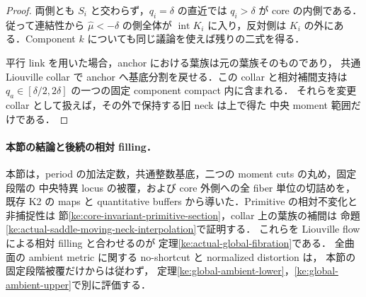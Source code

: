 \begin{proof}
両側とも $S_i$ と交わらず，$q_i=\delta$ の直近では
$q_i>\delta$ が core の内側である．従って連結性から
$\widehat\mu<-\delta$ の側全体が $\operatorname{int}K_i$ に入り，反対側は
$K_i$ の外にある．Component $k$ についても同じ議論を使えば残りの二式を得る．

平行 link を用いた場合，anchor における葉族は元の葉族そのものであり，
共通 Liouville collar で anchor へ基底分割を戻せる．この collar と相対補間支持は
$q_a\in[\delta/2,2\delta]$ の一つの固定 component compact 内に含まれる．
それらを変更 collar として扱えば，その外で保持する旧 neck は上で得た
中央 moment 範囲だけである．
\end{proof}

\paragraph{本節の結論と後続の相対 filling．}
本節は，period の加法定数，共通整数基底，二つの moment cuts の丸め，固定段階の
中央特異 locus の被覆，および core 外側への全 fiber 単位の切詰めを，既存 K2 の
maps と quantitative buffers から導いた．Primitive の相対不変化と非捕捉性は
節\ref{ke:core-invariant-primitive-section}，collar 上の葉族の補間は
命題\ref{ke:actual-saddle-moving-neck-interpolation}で証明する．
これらを Liouville flow による相対 filling と合わせるのが
定理\ref{ke:actual-global-fibration}である．
全曲面の ambient metric に関する no-shortcut と normalized distortion は，
本節の固定段階被覆だけからは従わず，
定理\ref{ke:global-ambient-lower}，\ref{ke:global-ambient-upper}で別に評価する．
